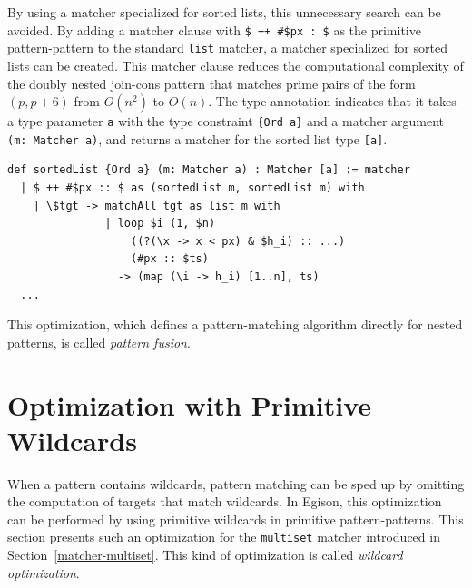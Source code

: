 By using a matcher specialized for sorted lists, this unnecessary search can be avoided.
By adding a matcher clause with \lstinline|$ ++ #$px : $| as the primitive pattern-pattern to the standard \lstinline{list} matcher, a matcher specialized for sorted lists can be created.
This matcher clause reduces the computational complexity of the doubly nested join-cons pattern that matches prime pairs of the form $(p,p+6)$ from $O(n^2)$ to $O(n)$.
The type annotation indicates that it takes a type parameter \lstinline{a} with the type constraint \lstinline|{Ord a}| and a matcher argument \lstinline|(m: Matcher a)|, and returns a matcher for the sorted list type \lstinline|[a]|.
\begin{lstlisting}[language=egison,numbers=none]
def sortedList {Ord a} (m: Matcher a) : Matcher [a] := matcher
  | $ ++ #$px :: $ as (sortedList m, sortedList m) with
    | \$tgt -> matchAll tgt as list m with
               | loop $i (1, $n)
                   ((?(\x -> x < px) & $h_i) :: ...)
                   (#px :: $ts)
                 -> (map (\i -> h_i) [1..n], ts)
  ...
\end{lstlisting}
This optimization, which defines a pattern-matching algorithm directly for nested patterns, is called \emph{pattern fusion}.

\section{Optimization with Primitive Wildcards}\label{matcher-wildcard}

When a pattern contains wildcards, pattern matching can be sped up by omitting the computation of targets that match wildcards.
In Egison, this optimization can be performed by using primitive wildcards in primitive pattern-patterns.
This section presents such an optimization for the \lstinline{multiset} matcher introduced in Section~\ref{matcher-multiset}.
This kind of optimization is called \emph{wildcard optimization}.

